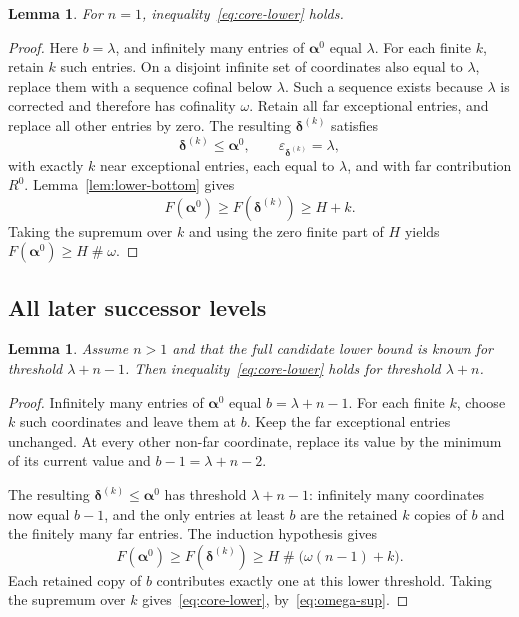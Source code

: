 \documentclass[11pt,letterpaper]{article}
\newtheorem{lemma}[theorem]{Lemma}
\theoremstyle{definition}
\theoremstyle{remark}
\newcommand{\seq}[1]{\boldsymbol{#1}}
\newcommand{\ns}{\mathbin{\#}}
\begin{document}
\begin{lemma}\label{lem:lower-first}
For $n=1$, inequality~\eqref{eq:core-lower} holds.
\end{lemma}
\begin{proof}
Here $b=\lambda$, and infinitely many entries of $\seq\alpha^0$ equal $\lambda$. For each finite $k$, retain $k$ such entries. On a disjoint infinite set of coordinates also equal to $\lambda$, replace them with a sequence cofinal below $\lambda$. Such a sequence exists because $\lambda$ is corrected and therefore has cofinality $\omega$. Retain all far exceptional entries, and replace all other entries by zero. The resulting $\seq\delta^{(k)}$ satisfies
\[
 \seq\delta^{(k)}\le\seq\alpha^0,\qquad
 \varepsilon_{\seq\delta^{(k)}}=\lambda,
\]
with exactly $k$ near exceptional entries, each equal to $\lambda$, and with far contribution $R^0$. Lemma~\ref{lem:lower-bottom} gives
\[
 F(\seq\alpha^0)\ge F(\seq\delta^{(k)})\ge H+k.
\]
Taking the supremum over $k$ and using the zero finite part of $H$ yields
$F(\seq\alpha^0)\ge H\ns\omega$.
\end{proof}

\subsection{All later successor levels}

\begin{lemma}\label{lem:lower-induction}
Assume $n>1$ and that the full candidate lower bound is known for threshold $\lambda+n-1$. Then inequality~\eqref{eq:core-lower} holds for threshold $\lambda+n$.
\end{lemma}
\begin{proof}
Infinitely many entries of $\seq\alpha^0$ equal $b=\lambda+n-1$. For each finite $k$, choose $k$ such coordinates and leave them at $b$. Keep the far exceptional entries unchanged. At every other non-far coordinate, replace its value by the minimum of its current value and $b-1=\lambda+n-2$.

The resulting $\seq\delta^{(k)}\le\seq\alpha^0$ has threshold $\lambda+n-1$: infinitely many coordinates now equal $b-1$, and the only entries at least $b$ are the retained $k$ copies of $b$ and the finitely many far entries. The induction hypothesis gives
\[
 F(\seq\alpha^0)\ge F(\seq\delta^{(k)})
     \ge H\ns\bigl(\omega(n-1)+k\bigr).
\]
Each retained copy of $b$ contributes exactly one at this lower threshold. Taking the supremum over $k$ gives~\eqref{eq:core-lower}, by~\eqref{eq:omega-sup}.
\end{proof}
\end{document}

